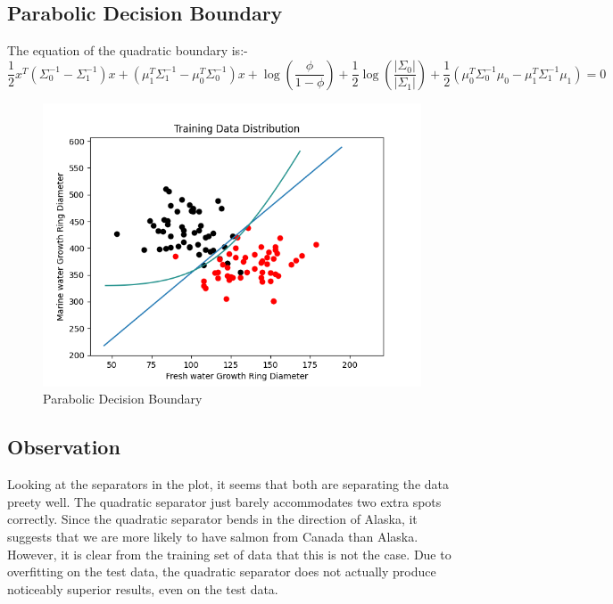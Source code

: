 \documentclass[12pt]{article}
\begin{document}
\subsection{Parabolic Decision Boundary} The equation of the quadratic boundary is:-
\begin{equation}
    \frac{1}{2} x^{T}\left(\Sigma_{0}^{-1}-\Sigma_{1}^{-1}\right) x+\left(\mu_{1}^{T} \Sigma_{1}^{-1}-\mu_{0}^{T} \Sigma_{0}^{-1}\right) x+\log \left(\frac{\phi}{1-\phi}\right)+\frac{1}{2} \log \left(\frac{\left|\Sigma_{0}\right|}{\left|\Sigma_{1}\right|}\right)+\frac{1}{2}\left(\mu_{0}^{T} \Sigma_{0}^{-1} \mu_{0}-\mu_{1}^{T} \Sigma_{1}^{-1} \mu_{1}\right)=0
\end{equation}
\begin{figure}[H]
  \includegraphics[width=\linewidth]{parabolicGdaDecsionBoundary.png}
  \caption{Parabolic Decision Boundary}
  \label{fig4C}
\end{figure}
\subsection{Observation}
Looking at the separators in the plot, it seems that both are separating the data preety well. The quadratic separator just barely accommodates two extra spots correctly. Since the quadratic separator bends in the direction of Alaska, it suggests that we are more likely to have salmon from Canada than Alaska. However, it is clear from the training set of data that this is not the case. Due to overfitting on the test data, the quadratic separator does not actually produce noticeably superior results, even on the test data.
\end{document}

